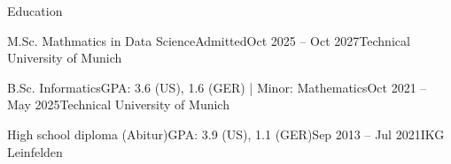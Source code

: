 \documentclass{kyvernitis-resume}
\begin{document}
\resumeheader
{}
{}
{}
{}{}{}


\begin{section}{Education}
    \begin{subsectionnolist}{M.Sc. Mathmatics in Data Science}{Admitted}{Oct 2025 -- Oct 2027}{Technical University of Munich}
    \end{subsectionnolist}
    \begin{subsectionnolist}{B.Sc. Informatics}{GPA: 3.6 (US), 1.6 (GER) | Minor: Mathematics}{Oct 2021 -- May 2025}{Technical University of Munich}
    \end{subsectionnolist}

    
    \begin{subsectionnolist}{High school diploma (Abitur)}{GPA: 3.9 (US), 1.1 (GER)}{Sep 2013 -- Jul 2021}{IKG Leinfelden}
    \end{subsectionnolist}
\end{section}
\end{document}
